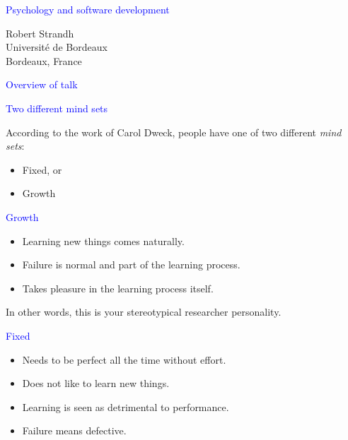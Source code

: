 \documentclass{slides}
\newcommand{\ti}[1]{\begin{center}\Large{\textcolor{blue}{#1}}\end{center}}
\begin{document}
\landscape
\setlength{\oddsidemargin}{1cm}
\setlength{\evensidemargin}{1cm}
\setlength{\marginparwidth}{1cm}
\setlength{\parskip}{0.5cm}
\setlength{\parindent}{0cm}
\begin{slide}\ti{Psychology and software development}
\vskip 0.5cm
\begin{center}
Robert Strandh \\
Université de Bordeaux \\
Bordeaux, France
\end{center}
\vfill\end{slide}
\begin{slide}\ti{Overview of talk}

\vfill\end{slide}
\begin{slide}\ti{Two different mind sets}

According to the work of Carol Dweck, people have one of two different
\emph{mind sets}:

\begin{itemize}
\item Fixed, or
\item Growth
\end{itemize}

\vfill\end{slide}
\begin{slide}\ti{Growth}

  \begin{itemize}
  \item Learning new things comes naturally.
  \item Failure is normal and part of the learning process.
  \item Takes pleasure in the learning process itself.
  \end{itemize}

In other words, this is your stereotypical researcher personality.

\vfill\end{slide}
\begin{slide}\ti{Fixed}

  \begin{itemize}
  \item Needs to be perfect all the time without effort.
  \item Does not like to learn new things.
  \item Learning is seen as detrimental to performance.
  \item Failure means defective.
  \end{itemize}

\vfill\end{slide}
\end{document}

